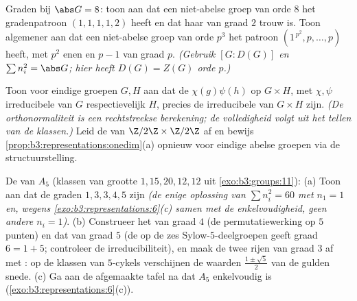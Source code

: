 \begin{exercise}[$\star\star$]\label{exo:b3:representations:7}
Graden bij $\abs G = 8$: toon aan dat een niet-abelse groep van
orde $8$ het gradenpatroon $(1,1,1,1,2)$ heeft en dat haar
 van graad $2$ trouw is. Toon algemener aan dat een
niet-abelse groep van orde $p^3$ het patroon $(1^{\,p^2}, p,
\dots, p)$ heeft, met $p^2$ enen en $p - 1$  van graad
$p$. \emph{(Gebruik $[G : D(G)]$ en $\sum n_i^2 = \abs G$; hier
heeft $D(G) = Z(G)$ orde $p$.)}
\end{exercise}

\begin{exercise}[$\star\star\star$]\label{exo:b3:representations:8}
Toon voor eindige groepen $G, H$ aan dat de 
$\chi(g)\psi(h)$ op $G \times H$, met $\chi, \psi$ irreducibele
 van $G$ respectievelijk $H$, precies de irreducibele
 van $G \times H$ zijn. \emph{(De orthonormaliteit is een
rechtstreekse berekening; de volledigheid volgt uit het tellen van
de klassen.)} Leid de  van $\Z/2\Z \times \Z/2\Z$ af
en bewijs \cref{prop:b3:representations:onedim}(a) opnieuw voor
eindige abelse groepen via de structuurstelling.
\end{exercise}

\begin{exercise}[$\star\star\star$]\label{exo:b3:representations:9}
De  van $A_5$ (klassen van grootte $1, 15, 20, 12,
12$ uit \cref{exo:b3:groups:11}):
(a) Toon aan dat de graden $1, 3, 3, 4, 5$ zijn \emph{(de enige
oplossing van $\sum n_i^2 = 60$ met $n_1 = 1$ en, wegens
\cref{exo:b3:representations:6}(c) samen met de enkelvoudigheid,
geen andere $n_i = 1$)}.
(b) Construeer het  van graad $4$ (de permutatiewerking op
$5$ punten) en dat van graad $5$ (de  op de zes
Sylow-$5$-deelgroepen geeft graad $6 = 1 + 5$; controleer de
irreducibiliteit), en maak de twee rijen van graad $3$ af met
: op de klassen van $5$-cykels verschijnen de
waarden $\frac{1\pm\sqrt5}2$ van de gulden snede.
(c) Ga aan de afgemaakte tafel na dat $A_5$ enkelvoudig is
(\cref{exo:b3:representations:6}(c)).
\end{exercise}

